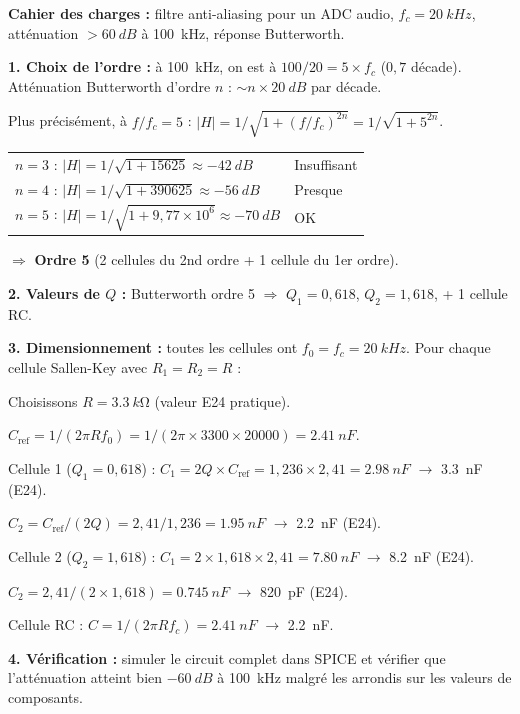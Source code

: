 \documentclass[12pt,a4paper,twoside]{book}
\begin{document}
\begin{pratique}
\textbf{Cahier des charges :} filtre anti-aliasing pour un ADC audio, $f_c = \SI{20}{kHz}$, atténuation $>\SI{60}{dB}$ à \SI{100}{kHz}, réponse Butterworth.

\textbf{1. Choix de l'ordre :} à \SI{100}{kHz}, on est à $100/20 = 5\times f_c$ ($0{,}7$ décade). Atténuation Butterworth d'ordre $n$ : $\sim n \times \SI{20}{dB}$ par décade.

Plus précisément, à $f/f_c = 5$ : $|H| = 1/\sqrt{1+(f/f_c)^{2n}} = 1/\sqrt{1+5^{2n}}$.

\begin{tabular}{ll}
$n=3$ : $|H| = 1/\sqrt{1+15625} \approx \SI{-42}{dB}$ & Insuffisant \\
$n=4$ : $|H| = 1/\sqrt{1+390625} \approx \SI{-56}{dB}$ & Presque \\
$n=5$ : $|H| = 1/\sqrt{1+9{,}77\times10^6} \approx \SI{-70}{dB}$ & OK \\
\end{tabular}

$\Rightarrow$ \textbf{Ordre 5} (2 cellules du 2nd ordre + 1 cellule du 1er ordre).

\textbf{2. Valeurs de $Q$ :} Butterworth ordre 5 $\Rightarrow$ $Q_1 = 0{,}618$, $Q_2 = 1{,}618$, + 1 cellule RC.

\textbf{3. Dimensionnement :} toutes les cellules ont $f_0 = f_c = \SI{20}{kHz}$. Pour chaque cellule Sallen-Key avec $R_1 = R_2 = R$ :

Choisissons $R = \SI{3.3}{k\ohm}$ (valeur E24 pratique).

$C_{\text{ref}} = 1/(2\pi R f_0) = 1/(2\pi\times3300\times20000) = \SI{2.41}{nF}$.

Cellule 1 ($Q_1 = 0{,}618$) : $C_1 = 2Q \times C_{\text{ref}} = 1{,}236\times2{,}41 = \SI{2.98}{nF}$ $\to$ \SI{3.3}{nF} (E24).

$C_2 = C_{\text{ref}}/(2Q) = 2{,}41/1{,}236 = \SI{1.95}{nF}$ $\to$ \SI{2.2}{nF} (E24).

Cellule 2 ($Q_2 = 1{,}618$) : $C_1 = 2\times1{,}618\times2{,}41 = \SI{7.80}{nF}$ $\to$ \SI{8.2}{nF} (E24).

$C_2 = 2{,}41/(2\times1{,}618) = \SI{0.745}{nF}$ $\to$ \SI{820}{pF} (E24).

Cellule RC : $C = 1/(2\pi R f_c) = \SI{2.41}{nF}$ $\to$ \SI{2.2}{nF}.

\textbf{4. Vérification :} simuler le circuit complet dans SPICE et vérifier que l'atténuation atteint bien $\SI{-60}{dB}$ à \SI{100}{kHz} malgré les arrondis sur les valeurs de composants.
\end{pratique}
\end{document}
